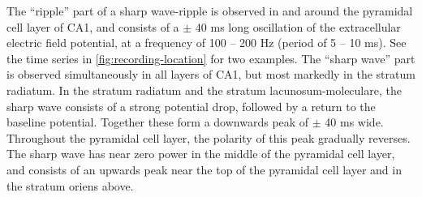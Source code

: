 The ``ripple'' part of a sharp wave-ripple is observed in and around the pyramidal cell layer of CA1, and consists of a $\pm$ 40 ms long oscillation of the extracellular electric field potential, at a frequency of 100 -- 200 Hz (period of 5 -- 10 ms). See the time series in \cref{fig:recording-location} for two examples. The ``sharp wave'' part is observed simultaneously in all layers of CA1, but most markedly in the stratum radiatum. In the stratum radiatum and the stratum lacunosum-moleculare, the sharp wave consists of a strong potential drop, followed by a return to the baseline potential. Together these form a downwards peak of $\pm$ 40 ms wide. Throughout the pyramidal cell layer, the polarity of this peak gradually reverses. The sharp wave has near zero power in the middle of the pyramidal cell layer, and consists of an upwards peak near the top of the pyramidal cell layer and in the stratum oriens above.
